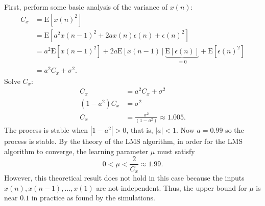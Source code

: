 \begin{enumerate}
  \begin{solution}

    First, perform some basic analysis of the variance of $x(n)$:
    \begin{align*}
      C_x &= \mathrm{E}[x(n)^2]
      \\
      &= \mathrm{E}[a^2x(n-1)^2 + 2ax(n)\epsilon(n) + \epsilon(n)^2]
      \\
      &= a^2\mathrm{E}[x(n-1)^2] +
      2a\mathrm{E}[x(n-1)]\underbrace{\mathrm{E}[\epsilon(n)]}_{=0} +
      \mathrm{E}[\epsilon(n)^2]
      \\
      &= a^2 C_x + \sigma^2.
    \end{align*}
    Solve $C_x$:
    \begin{align*}
      C_x &= a^2C_x + \sigma^2
      \\
      (1-a^2)C_x &= \sigma^2
      \\
      C_x &= \frac{\sigma^2}{(1-a^2)} \approx 1.005.
    \end{align*}
    The process is stable when $|1-a^2|>0$, that is, $|a|<1$. Now
    $a=0.99$ so the process is stable.  By the theory of the LMS
    algorithm, in order for the LMS algorithm to converge, the
    learning parameter $\mu$ must satisfy
    \begin{equation*}
      0 < \mu < \frac{2}{C_x} \approx 1.99.
    \end{equation*}
    However, this theoretical result does not hold in this case
    because the inputs $x(n),x(n-1),\ldots,x(1)$ are not independent.
    Thus, the upper bound for $\mu$ is near $0.1$ in practice as found
    by the simulations.
    
    
  \end{solution}
  

    

\end{enumerate}
